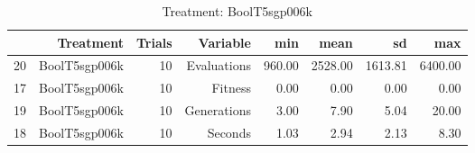 \begin{table}[ht]
\centering
\begin{tabular}{rrrrrrrr}
  \hline
 & Treatment & Trials & Variable & min & mean & sd & max \\ 
  \hline
20 & BoolT5sgp006k &  10 & Evaluations & 960.00 & 2528.00 & 1613.81 & 6400.00 \\ 
  17 & BoolT5sgp006k &  10 & Fitness & 0.00 & 0.00 & 0.00 & 0.00 \\ 
  19 & BoolT5sgp006k &  10 & Generations & 3.00 & 7.90 & 5.04 & 20.00 \\ 
  18 & BoolT5sgp006k &  10 & Seconds & 1.03 & 2.94 & 2.13 & 8.30 \\ 
   \hline
\end{tabular}
\caption{Treatment: BoolT5sgp006k} 
\end{table}
